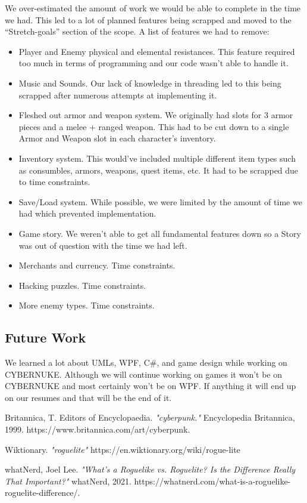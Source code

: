 \documentclass[10pt,conference,onecolumn,compsoc]{IEEEtran}
\begin{document}
We over-estimated the amount of work we would be able to complete in the time we had. This led to a lot of planned features being scrapped and moved to the “Stretch-goals” section of the scope.
A list of features we had to remove:
\begin{itemize}
\item Player and Enemy physical and elemental resistances. This feature required too much in terms of programming and our code wasn't able to handle it.
\item Music and Sounds. Our lack of knowledge in threading led to this being scrapped after numerous attempts at implementing it.
\item Fleshed out armor and weapon system. We originally had slots for 3 armor pieces and a melee + ranged weapon. This had to be cut down to a single Armor and Weapon slot in each character's inventory.
\item Inventory system. This would've included multiple different item types such as consumbles, armors, weapons, quest items, etc. It had to be scrapped due to time constraints.
\item Save/Load system. While possible, we were limited by the amount of time we had which prevented implementation.
\item Game story. We weren't able to get all fundamental features down so a Story was out of question with the time we had left.
\item Merchants and currency. Time constraints.
\item Hacking puzzles. Time constraints.
\item More enemy types. Time constraints.
\end{itemize}

\subsection{Future Work}
We learned a lot about UMLs, WPF, C\#, and game design while working on CYBERNUKE. Although we will continue working on games it won't be on CYBERNUKE and most certainly won't be on WPF. If anything it will end up on our resumes and that will be the end of it.





\begin{thebibliography}{1}

Britannica, T. Editors of Encyclopaedia. \emph{"cyberpunk."} Encyclopedia Britannica, 1999. https://www.britannica.com/art/cyberpunk.

Wiktionary. \emph{"roguelite"}
https://en.wiktionary.org/wiki/rogue-lite

whatNerd, Joel Lee. \emph{"What’s a Roguelike vs. Roguelite? Is the Difference Really That Important?"} whatNerd, 2021. https://whatnerd.com/what-is-a-roguelike-roguelite-difference/.

\end{thebibliography}

\end{document}
